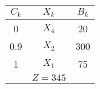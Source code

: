     \begin{tabular}{ccc}
    \hline
    \hline
    $C_k$   & $X_k$   & $B_k$ \bigstrut\\
    \hline
    0       & $X_4$   & 20 \bigstrut[t]\\
    0.9     & $X_2$   & 300 \\
    1       & $X_1$   & 75 \bigstrut[b]\\
    \hline
            & $Z=345$ &  \bigstrut\\
    \hline
    \hline
    \end{tabular}%
